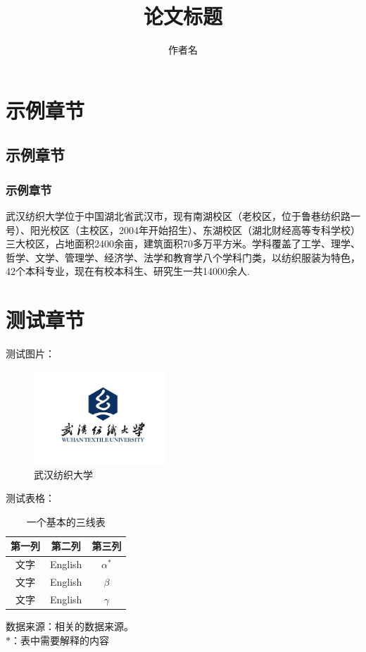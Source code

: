\documentclass[zihao = -4,cn]{oucart}
\title{论文标题}
\author{作者名}
\begin{document}
	
\pagestyle{fancy}
\renewcommand{\headrulewidth}{1pt}

\makecover


\makeabstract


\begin{spacing}{1.75}
\tableofcontents
\end{spacing}

\newpage
{}
\setcounter{page}{1} 
\section{示例章节}
\subsection{示例章节}
\subsubsection{示例章节}
武汉纺织大学位于中国湖北省武汉市，现有南湖校区（老校区，位于鲁巷纺织路一号）、阳光校区（主校区，2004年开始招生）、东湖校区（湖北财经高等专科学校）三大校区，占地面积2400余亩，建筑面积70多万平方米。学科覆盖了工学、理学、哲学、文学、管理学、经济学、法学和教育学八个学科门类，以纺织服装为特色，42个本科专业，现在有校本科生、研究生一共14000余人\cite{wiki:xxx}. 
\section{测试章节}
测试图片：
\begin{figure}[!htbp]
    \centering
    \includegraphics[width=5cm]{figures/wtulogo}
    \caption{武汉纺织大学}
    \label{fig:ouc1}
\end{figure}

测试表格：
\begin{table}[!htbp]
\centering
\caption{一个基本的三线表}
\begin{minipage}[t]{350pt}
\begin{tabular*}{350pt}{@{\extracolsep{\fill}}ccc}
\toprule
第一列 & 第二列 & 第三列 \\
\midrule
文字 & English & $\alpha^*$ \\
文字 & English & $\beta$ \\
文字 & English & $\gamma$\\
\bottomrule
\end{tabular*}
\footnotesize
数据来源：相关的数据来源。 \\
$*$：表中需要解释的内容
\end{minipage}
\end{table}
\end{document}
